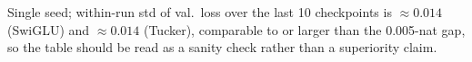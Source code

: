 Single seed; within-run std of val.\ loss over the last 10 checkpoints is $\approx0.014$ (SwiGLU) and $\approx0.014$ (Tucker), comparable to or larger than the 0.005-nat gap, so the table should be read as a sanity check rather than a superiority claim.
